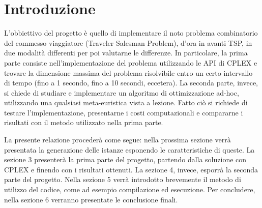 
\section{Introduzione}

L'obbiettivo del progetto è quello di implementare il noto problema combinatorio del commesso viaggiatore (Traveler Salesman Problem), d'ora in avanti TSP, in due modalità differenti
per poi valutarne le differenze.
In particolare, la prima parte consiste nell'implementazione del problema utilizzando le API di CPLEX e trovare la dimensione massima del problema risolvibile entro un certo intervallo
di tempo (fino a 1 secondo, fino a 10 secondi, eccetera).
La seconda parte, invece, si chiede di studiare e implementare un algoritmo di ottimizzazione ad-hoc, utilizzando una qualsiasi meta-euristica vista a lezione.
Fatto ciò si richiede di testare l'implementazione, presentarne i costi computazionali e compararne i risultati con il metodo utilizzato nella prima parte.

La presente relazione procederà come segue: nella prossima sezione verrà presentata la generazione delle istanze esponendo le caratteristiche di queste.
La sezione 3 presenterà la prima parte del progetto, partendo dalla soluzione con CPLEX e finendo con i risultati ottenuti.
La sezione 4, invece, esporrà la seconda parte del progetto.
Nella sezione 5 verrà introdotto brevemente il metodo di utilizzo del codice, come ad esempio compilazione ed esecuzione.
Per concludere, nella sezione 6 verranno presentate le conclusione finali.
